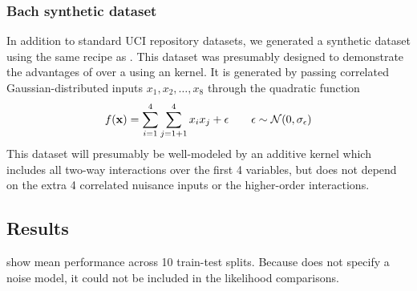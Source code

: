 \subsubsection{Bach synthetic dataset}
In addition to standard UCI repository datasets, we generated a synthetic dataset using the same recipe as \citet{Bach_HKL}.
This dataset was presumably designed to demonstrate the advantages of \HKL{} over a \gp{} using an \seard{} kernel.
It is generated by passing correlated Gaussian-distributed inputs $x_1, x_2, \dots, x_8$ through the quadratic function
%
\begin{align}
f({\bf{x}}) = \sum_{i=1}^4 \sum_{j=1+1}^4 x_i x_j + \epsilon \qquad \epsilon \sim \mathcal{N}\!\left(0,\sigma_\epsilon\right)
\end{align}
%
This dataset will presumably be well-modeled by an additive kernel which includes all two-way interactions over the first 4 variables, but does not depend on the extra 4 correlated nuisance inputs or the higher-order interactions.%

 
 
\subsection{Results}
 show mean performance across 10 train-test splits.
Because \HKL{} does not specify a noise model, it could not be included in the likelihood comparisons.

